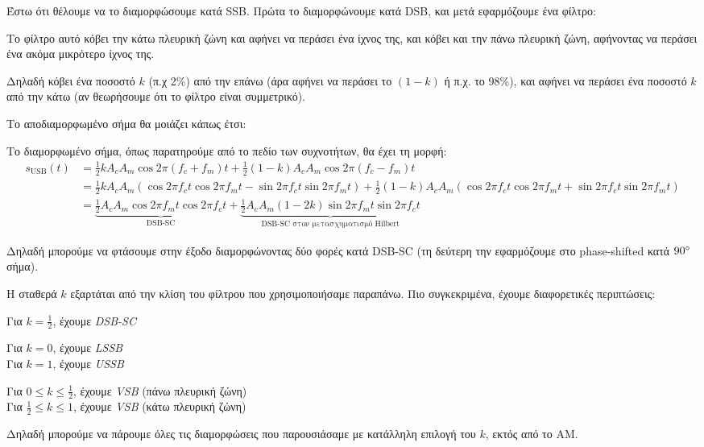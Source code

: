 \documentclass[11pt,a4paper,notitlepage,fleqn]{article}
\begin{document}
Έστω ότι θέλουμε να το διαμορφώσουμε κατά SSB. Πρώτα το διαμορφώνουμε κατά DSB, και μετά
εφαρμόζουμε ένα φίλτρο:

Το φίλτρο αυτό κόβει την κάτω πλευρική ζώνη και αφήνει να περάσει ένα ίχνος της, και κόβει
και την πάνω πλευρική ζώνη, αφήνοντας να περάσει ένα ακόμα μικρότερο ίχνος της.

Δηλαδή κόβει ένα ποσοστό \( k \) (π.χ 2\%) από την επάνω (άρα αφήνει να περάσει το \( (1-k)
 \) ή π.χ. το 98\%), και αφήνει να περάσει ένα ποσοστό \( k \) από την κάτω (αν θεωρήσουμε
 ότι το φίλτρο είναι συμμετρικό).
 
Το αποδιαμορφωμένο σήμα θα μοιάζει κάπως έτσι:

Το διαμορφωμένο σήμα, όπως παρατηρούμε από το πεδίο των συχνοτήτων, θα έχει τη μορφή:
\begin{align*}
	s_{\mathrm{USB}}(t) &= \frac{1}{2}kA_cA_m\cos 2π(f_c+f_m)t
	+ \frac{1}{2}(1-k)A_cA_m\cos 2π (f_c-f_m)t \\
	&= \frac{1}{2}kA_cA_m\left(
	\cos2πf_ct\cos2πf_mt-\sin2πf_ct\sin2πf_mt
	\right) + \frac{1}{2}(1-k)A_cA_m\left(
	\cos2πf_ct\cos2πf_mt+\sin2πf_ct\sin2πf_mt
	\right)
	\\ &=
	\underbrace{\frac{1}{2}A_cA_m\cos2πf_m t\cos2πf_c t}_{\text{DSB-SC}}
	+ \underbrace{\frac{1}{2}A_cA_m(1-2k)\sin2πf_mt\sin2πf_ct}_{\text{DSB-SC στον
			μετασχηματισμό Hilbert}}
\end{align*}

Δηλαδή μπορούμε να φτάσουμε στην έξοδο διαμορφώνοντας δύο φορές κατά DSB-SC (τη
δεύτερη την εφαρμόζουμε στο phase-shifted κατά \( 90^{\circ} \) σήμα).

Η σταθερά \( k \) εξαρτάται από την κλίση του φίλτρου που χρησιμοποιήσαμε παραπάνω.
Πιο συγκεκριμένα, έχουμε διαφορετικές περιπτώσεις:

\begin{enumpar}
	\item Για \( k=\frac{1}{2} \), έχουμε \emph{DSB-SC}
	\item Για \( k=0 \), έχουμε \emph{LSSB} \\
	Για \( k=1 \), έχουμε \emph{USSB}
	\item Για \( 0\leq k \leq \frac{1}{2} \), έχουμε \emph{VSB} (πάνω πλευρική ζώνη)
	\\
	Για \( \frac{1}{2} \leq k \leq 1 \), έχουμε \emph{VSB} (κάτω πλευρική ζώνη)
\end{enumpar}

Δηλαδή μπορούμε να πάρουμε όλες τις διαμορφώσεις που παρουσιάσαμε με κατάλληλη επιλογή
του \( k \), εκτός από το ΑΜ.
\end{document}
